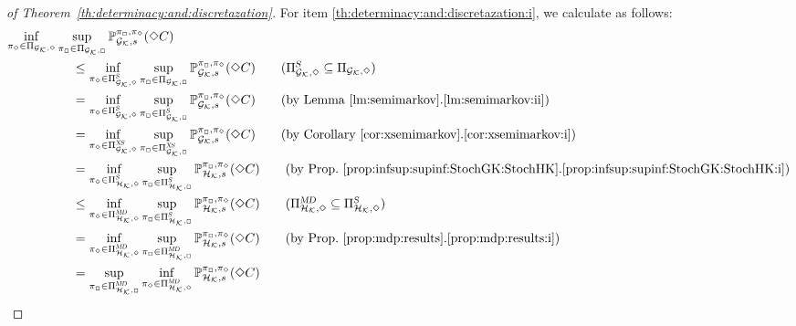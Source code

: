 \begin{proof}[of Theorem~\ref{th:determinacy:and:discretazation}]
  For item \ref{th:determinacy:and:discretazation:i}, we calculate as
  follows:
  \begin{align*}
    \inf_{\strat_\minplay\in\Strategies{\StochGK,\minplay}}\sup_{\strat_\maxplay\in\Strategies{\StochGK,\maxplay}}\Prob^{\strat_{\maxplay},\strat_{\minplay}}_{\StochGK,s}(\Finally C)
    \hspace{-8em} &
    \\
    & \leq
    \inf_{\strat_\minplay\in\SemiMarkovStrats{\StochGK,\minplay}}\sup_{\strat_\maxplay\in\Strategies{\StochGK,\maxplay}}\Prob^{\strat_{\maxplay},\strat_{\minplay}}_{\StochGK,s}(\Finally C)
    \tag{$\SemiMarkovStrats{\StochGK,\minplay}\subseteq\Strategies{\StochGK,\minplay}$}\\
    & =
    \inf_{\strat_\minplay\in\SemiMarkovStrats{\StochGK,\minplay}}\sup_{\strat_\maxplay\in\SemiMarkovStrats{\StochGK,\maxplay}}\Prob^{\strat_{\maxplay},\strat_{\minplay}}_{\StochGK,s}(\Finally C)
    \tag{by Lemma~\ref{lm:semimarkov}.\ref{lm:semimarkov:ii}}\\
    & =
    \inf_{\strat_\minplay\in\XSemiMarkovStrats{\StochGK,\minplay}}\sup_{\strat_\maxplay\in\XSemiMarkovStrats{\StochGK,\maxplay}}\Prob^{\strat_{\maxplay},\strat_{\minplay}}_{\StochGK,s}(\Finally C)
    \tag{by Corollary~\ref{cor:xsemimarkov}.\ref{cor:xsemimarkov:i}}\\
    & =
    \inf_{\strat_\minplay\in\SemiMarkovStrats{\StochHK,\minplay}}\sup_{\strat_\maxplay\in\SemiMarkovStrats{\StochHK,\maxplay}}\Prob^{\strat_{\maxplay},\strat_{\minplay}}_{\StochHK,s}(\Finally C)
    \tag{by Prop.~\ref{prop:infsup:supinf:StochGK:StochHK}.\ref{prop:infsup:supinf:StochGK:StochHK:i}}\\
    & \leq
    \inf_{\strat_\minplay\in\DetMemorylessStrats{\StochHK,\minplay}}\sup_{\strat_\maxplay\in\SemiMarkovStrats{\StochHK,\maxplay}}\Prob^{\strat_{\maxplay},\strat_{\minplay}}_{\StochHK,s}(\Finally C)
    \tag{$\DetMemorylessStrats{\StochHK,\minplay}\subseteq\SemiMarkovStrats{\StochHK,\minplay}$}\\
    & =
    \inf_{\strat_\minplay\in\DetMemorylessStrats{\StochHK,\minplay}}\sup_{\strat_\maxplay\in\DetMemorylessStrats{\StochHK,\maxplay}}\Prob^{\strat_{\maxplay},\strat_{\minplay}}_{\StochHK,s}(\Finally C)
    \tag{by Prop.~\ref{prop:mdp:results}.\ref{prop:mdp:results:i}}\\
    & =
    \sup_{\strat_\maxplay\in\DetMemorylessStrats{\StochHK,\maxplay}}\inf_{\strat_\minplay\in\DetMemorylessStrats{\StochHK,\minplay}}\Prob^{\strat_{\maxplay},\strat_{\minplay}}_{\StochHK,s}(\Finally C)

\end{align*}
\end{proof}
